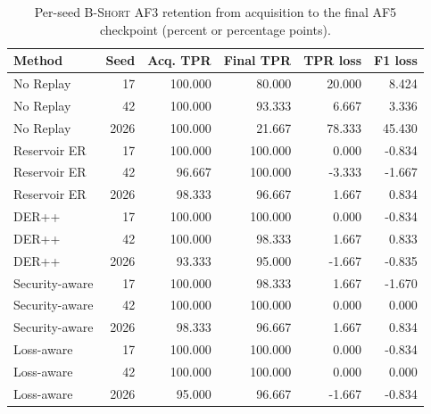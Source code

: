 \documentclass[conference]{IEEEtran}
\newcommand{\bshort}{\textsc{B-Short}}
\newcommand{\af}[1]{\textsc{AF#1}}
\begin{document}
\begin{table}[t]
\caption{Per-seed \bshort{} \af{3} retention from acquisition to the final \af{5} checkpoint (percent or percentage points).}
\label{tab:af3-seed}

\centering
\scriptsize
\setlength{\tabcolsep}{3.4pt}
\begin{tabular}{@{}lrrrrr@{}}
\toprule
Method & Seed & Acq. TPR & Final TPR & TPR loss & F1 loss \\
\midrule
No Replay & 17 & 100.000 & 80.000 & 20.000 & 8.424 \\
No Replay & 42 & 100.000 & 93.333 & 6.667 & 3.336 \\
No Replay & 2026 & 100.000 & 21.667 & 78.333 & 45.430 \\
Reservoir ER & 17 & 100.000 & 100.000 & 0.000 & -0.834 \\
Reservoir ER & 42 & 96.667 & 100.000 & -3.333 & -1.667 \\
Reservoir ER & 2026 & 98.333 & 96.667 & 1.667 & 0.834 \\
DER++ & 17 & 100.000 & 100.000 & 0.000 & -0.834 \\
DER++ & 42 & 100.000 & 98.333 & 1.667 & 0.833 \\
DER++ & 2026 & 93.333 & 95.000 & -1.667 & -0.835 \\
Security-aware & 17 & 100.000 & 98.333 & 1.667 & -1.670 \\
Security-aware & 42 & 100.000 & 100.000 & 0.000 & 0.000 \\
Security-aware & 2026 & 98.333 & 96.667 & 1.667 & 0.834 \\
Loss-aware & 17 & 100.000 & 100.000 & 0.000 & -0.834 \\
Loss-aware & 42 & 100.000 & 100.000 & 0.000 & 0.000 \\
Loss-aware & 2026 & 95.000 & 96.667 & -1.667 & -0.834 \\
\bottomrule
\end{tabular}


\end{table}
\end{document}
